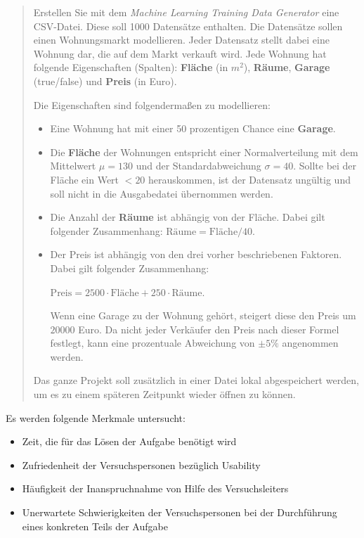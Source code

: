 \begin{quote}
    
    Erstellen Sie mit dem \textit{Machine Learning Training Data Generator} eine CSV-Datei. Diese soll 1000 Datensätze enthalten. Die Datensätze sollen einen Wohnungsmarkt modellieren. Jeder Datensatz stellt dabei eine Wohnung dar, die auf dem Markt verkauft wird. Jede Wohnung hat folgende Eigenschaften (Spalten): \textbf{Fläche} (in $m^2$), \textbf{Räume}, \textbf{Garage} (true/false) und \textbf{Preis} (in Euro).

    Die Eigenschaften sind folgendermaßen zu modellieren:
    \begin{itemize}
        \item Eine Wohnung hat mit einer 50 prozentigen Chance eine \textbf{Garage}.
        \item Die \textbf{Fläche} der Wohnungen entspricht einer Normalverteilung mit dem Mittelwert $\mu = 130$ und der Standardabweichung $\sigma = 40$. Sollte bei der Fläche ein Wert $< 20$ herauskommen, ist der Datensatz ungültig und soll nicht in die Ausgabedatei übernommen werden.
        \item Die Anzahl der \textbf{Räume} ist abhängig von der Fläche. Dabei gilt folgender Zusammenhang: $\textrm{Räume} = \textrm{Fläche} / 40$.
        \item Der Preis ist abhängig von den drei vorher beschriebenen Faktoren. Dabei gilt folgender Zusammenhang:
        
        $\textrm{Preis} = 2500 \cdot \textrm{Fläche} + 250 \cdot \textrm{Räume}$.
        
        Wenn eine Garage zu der Wohnung gehört, steigert diese den Preis um $20000$ Euro. Da nicht jeder Verkäufer den Preis nach dieser Formel festlegt, kann eine prozentuale Abweichung von $\pm 5\%$ angenommen werden.
    \end{itemize}

    Das ganze Projekt soll zusätzlich in einer Datei lokal abgespeichert werden, um es zu einem späteren Zeitpunkt wieder öffnen zu können.

\end{quote}

Es werden folgende Merkmale untersucht:
\begin{itemize}
    \item Zeit, die für das Lösen der Aufgabe benötigt wird
    \item Zufriedenheit der Versuchspersonen bezüglich Usability
    \item Häufigkeit der Inanspruchnahme von Hilfe des Versuchsleiters
    \item Unerwartete Schwierigkeiten der Versuchspersonen bei der Durchführung eines konkreten Teils der Aufgabe
\end{itemize}

